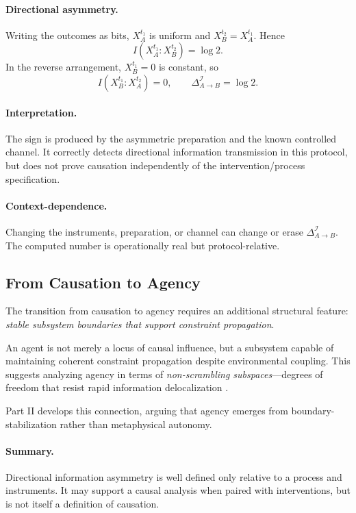 \documentclass[12pt,a4paper,openany]{book}
\begin{document}
\paragraph{Directional asymmetry.}
Writing the outcomes as bits, $X_A^{t_1}$ is uniform and $X_B^{t_2}=X_A^{t_1}$.  Hence
\begin{equation}
I(X_A^{t_1}:X_B^{t_2})=\log2.
\end{equation}
In the reverse arrangement, $X_B^{t_1}=0$ is constant, so
\begin{equation}
I(X_B^{t_1}:X_A^{t_2})=0,
\qquad
\Delta_{A\to B}^{\mathcal I}=\log2.
\end{equation}

\paragraph{Interpretation.}
The sign is produced by the asymmetric preparation and the known controlled channel.  It correctly detects directional information transmission in this protocol, but does not prove causation independently of the intervention/process specification.

\paragraph{Context-dependence.}
Changing the instruments, preparation, or channel can change or erase $\Delta_{A\to B}^{\mathcal I}$.  The computed number is operationally real but protocol-relative.

\subsection{From Causation to Agency}
\label{H-C-sec:I.6}

The transition from causation to agency requires an additional structural feature: \emph{stable subsystem boundaries that support constraint propagation}.

An agent is not merely a locus of causal influence, but a subsystem capable of maintaining coherent constraint propagation despite environmental coupling. This suggests analyzing agency in terms of \emph{non-scrambling subspaces}—degrees of freedom that resist rapid information delocalization \cite{Hayden2007}.

Part II develops this connection, arguing that agency emerges from boundary-stabilization rather than metaphysical autonomy.

\paragraph{Summary.} Directional information asymmetry is well defined only relative to a process and instruments.  It may support a causal analysis when paired with interventions, but is not itself a definition of causation.
\end{document}
